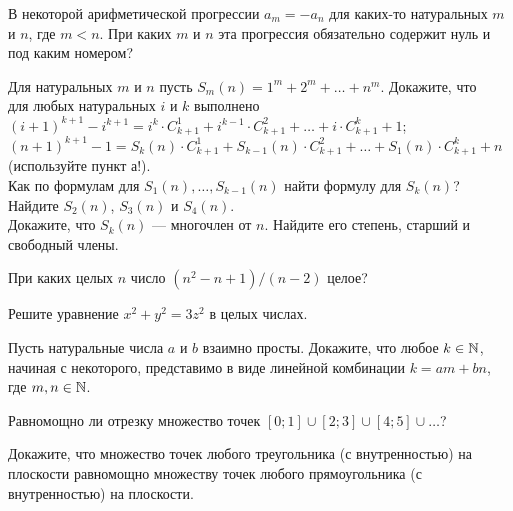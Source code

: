 \documentclass[a4paper,12pt]{article}
\begin{document}
 В некоторой арифметической прогрессии $a_m=-a_n$
для каких-то натуральных $m$ и $n$, где $m<n$. При каких $m$ и $n$
эта прогрессия обязательно содержит нуль и под каким номером?



Для натуральных $m$ и $n$ пусть $S_m(n)=1^m+2^m+\ldots+n^m$. Докажите, что\\
 для любых натуральных $i$ и $k$ выполнено $(i+1)^{k+1}-i^{k+1}=
i^k\cdot C^1_{k+1}+i^{k-1}\cdot C^2_{k+1}+\ldots+i\cdot
C^k_{k+1}+1$;\\
$(n+1)^{k+1}-1=
S_k(n)\cdot C^1_{k+1}+S_{k-1}(n)\cdot C^2_{k+1}+
\ldots+S_1(n)\cdot C^k_{k+1}+n$ (используйте пункт а!).\\
Как по формулам для $S_1(n),\ldots, S_{k-1}(n)$ найти
формулу для $S_k(n)$?\\
 Найдите $S_2(n)$, $S_3(n)$ и $S_4(n)$.\\
Докажите, что $S_k(n)$ --- многочлен %
от $n$. Найдите его степень, старший и свободный члены.


При каких целых $n$ число $(n^2 - n + 1)/(n - 2)$ целое?

Решите уравнение $x^2+y^2=3z^2$ в целых числах.



Пусть натуральные числа $a$ и $b$ взаимно просты. Докажите, что любое $k\in \mathbb{N}$, начиная с некоторого, представимо в виде линейной комбинации
$k=am+bn$, где $m,n\in \mathbb{N}$.


Равномощно ли отрезку множество точек $[0;1]\cup[2;3]\cup[4;5]\cup\ldots$?

Докажите, что множество точек любого треугольника
(с внутренностью) на плоскости равномощно множеству точек
любого прямоугольника (с внутренностью) на плоскости.
\end{document}
